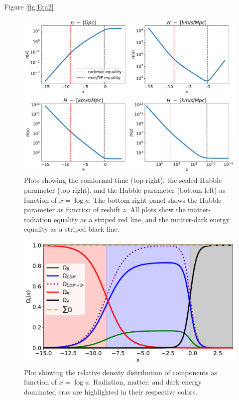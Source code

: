 \documentclass[10pt, a4paper]{article}
\begin{document}
Figure \ref{fig:Eta2} 


\begin{figure}[H]
    \centering
    \includegraphics[scale=0.5]{../m1_figs/H.pdf}
    \caption{Plots showing the comformal time (top-right), the scaled Hubble parameter (top-right), and the Hubble parameter (bottom-left) as function of $x=\log{a}$. The bottom-right panel shows the Hubble parameter as function of reshift $z$. All plots show the matter-radiation equality as a striped red line, and the matter-dark energy equality as a striped black line.}
    \label{fig:H}
\end{figure}


\begin{figure}[H]
    \centering
    \includegraphics[scale=0.5]{../m1_figs/Omegas.pdf}
    \caption{Plot showing the relative density distribution of components as function of $x=\log{a}$. Radiation, matter, and dark energy dominated eras are highlighted in their respective colors.}
    \label{fig:Omegas}
\end{figure}
\end{document}
